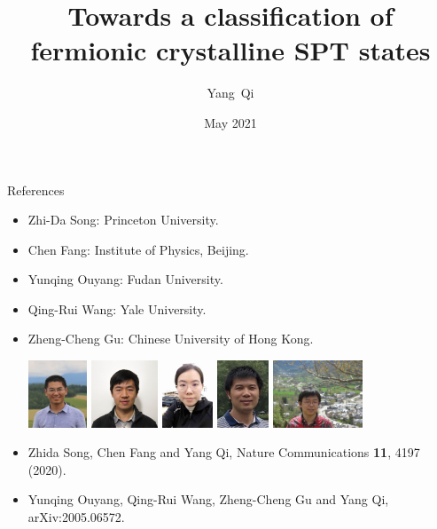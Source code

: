 \documentclass[xcolor=table, aspectratio=169,ignorenonframetext]{beamer}
\title %
{Towards a classification of fermionic crystalline SPT states}
\author[Y Qi] %
{Yang~Qi}
\institute[Fudan] %
{
Department of Physics, Fudan University.
}
\date{May 2021}
\begin{document}
\begin{frame}
  \titlepage
\end{frame}

\begin{frame}{References}
\begin{itemize}
\item Zhi-Da Song: Princeton University.
\item Chen Fang: Institute of Physics, Beijing.
\item Yunqing Ouyang: Fudan University.
\item Qing-Rui Wang: Yale University.
\item Zheng-Cheng Gu: Chinese University of Hong Kong.
\begin{center}
	\includegraphics[height=2cm]{../people/zhidasong}
	\includegraphics[height=2cm]{../people/chenfang}
        \includegraphics[height=2cm]{../people/yunqing}
        \includegraphics[height=2cm]{../people/qingrui}
        \includegraphics[height=2cm]{../people/zhengcheng}
\end{center}
\item Zhida Song, Chen Fang and Yang Qi, Nature Communications \textbf{11}, 4197 (2020).
\item Yunqing Ouyang, Qing-Rui Wang, Zheng-Cheng Gu and Yang Qi, arXiv:2005.06572.
\end{itemize}
\end{frame}
\end{document}
